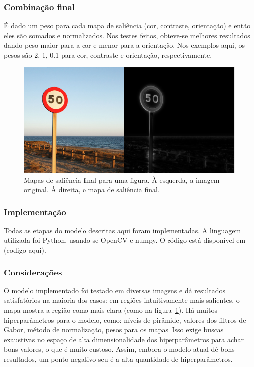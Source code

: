 \documentclass[11pt]{article}
\begin{document}
\subsubsection{Combinação final}
É dado um peso para cada mapa de saliência (cor, contraste, orientação)
e então eles são somados e normalizados. Nos testes feitos, obteve-se
melhores resultados dando peso maior para a cor e menor para a orientação.
Nos exemplos aqui, os pesos são 2, 1, 0.1 para cor, contraste e orientação,
respectivamente.
\begin{figure}[H]
\begin{center}
        \includegraphics[width=0.6\linewidth]{img/att.png}
\end{center}
\caption{Mapas de saliência final para uma figura. À esquerda, a imagem
original. À direita, o mapa de saliência final.}
\label{fig:att}
\end{figure}

\subsubsection{Implementação}
Todas as etapas do modelo descritas aqui foram implementadas.
A linguagem utilizada foi Python, usando-se OpenCV e numpy.
O código está disponível em (codigo aqui).

\subsubsection{Considerações}
O modelo implementado foi testado em diversas imagens e dá resultados
satisfatórios na maioria dos casos: em regiões intuitivamente mais salientes,
o mapa mostra a região como mais clara (como na figura~\ref{fig:att}).
Há muitos hiperparâmetros para o modelo, como: níveis de pirâmide,
valores dos filtros de Gabor, método de normalização, pesos para os mapas.
Isso exige buscas exaustivas no espaço de alta dimensionalidade dos
hiperparâmetros para achar bons valores, o que é muito custoso.
Assim, embora o modelo atual dê bons resultados, um ponto negativo seu
é a alta quantidade de hiperparâmetros.
\end{document}
